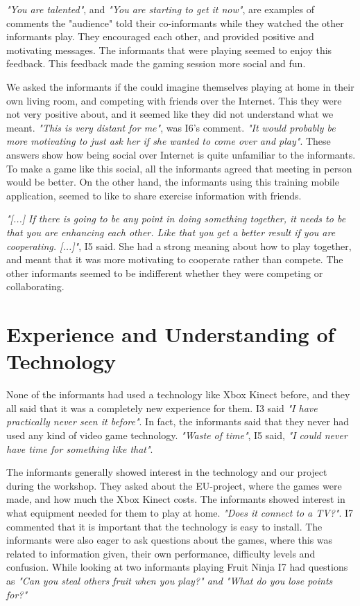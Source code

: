 \emph{"You are talented"}, and \emph{"You are starting to get it now"}, are examples of comments the "audience" told their co-informants while they watched the other informants play. They encouraged each other, and provided positive and motivating messages. The informants that were playing seemed to enjoy this feedback. This feedback made the gaming session more social and fun.  

We asked the informants if the could imagine themselves playing at home in their own living room, and competing with friends over the Internet. This they were not very positive about, and it seemed like they did not understand what we meant. \emph{"This is very distant for me"}, was I6's comment. \emph{"It would probably be more motivating to just ask her if she wanted to come over and play"}. These answers show how being social over Internet is quite unfamiliar to the informants. To make a game like this social, all the informants agreed that meeting in person would be better. On the other hand, the informants using this training mobile application, seemed to like to share exercise information with friends.

\emph{"[...] If there is going to be any point in doing something together, it needs to be that you are enhancing each other. Like that you get a better result if you are cooperating. [...]"}, I5 said. She had a strong meaning about how to play together, and meant that it was more motivating to cooperate rather than compete. The other informants seemed to be indifferent whether they were competing or collaborating.

\section{Experience and Understanding of Technology}
None of the informants had used a technology like Xbox Kinect before, and they all said that it was a completely new experience for them. I3 said \emph{"I have practically never seen it before"}. In fact, the informants said that they never had used any kind of video game technology. \emph{"Waste of time"}, I5 said, \emph{"I could never have time for something like that"}.  

The informants generally showed interest in the technology and our project during the workshop. They asked about the EU-project, where the games were made, and how much the Xbox Kinect costs. The informants showed interest in what equipment needed for them to play at home. \emph{"Does it connect to a TV?"}. I7 commented that it is important that the technology is easy to install. The informants were also eager to ask questions about the games, where this was related to information given, their own performance, difficulty levels and confusion. While looking at two informants playing Fruit Ninja I7 had questions as \emph{"Can you steal others fruit when you play?" and "What do you lose points for?"} 


